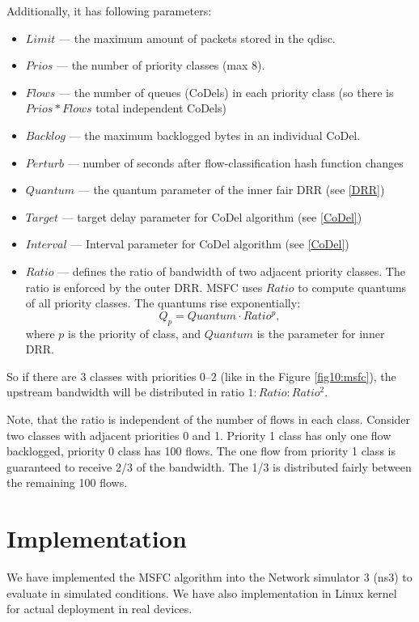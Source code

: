 Additionally, it has following parameters:
\begin{itemize}
	\item $Limit$ --- the maximum amount of packets stored in the qdisc.
	\item $Prios$ --- the number of priority classes (max 8).
	\item $Flows$ --- the number of queues (CoDels) in each priority class (so there is $Prios*Flows$ total independent CoDels)
	\item $Backlog$ --- the maximum backlogged bytes in an individual CoDel.
	\item $Perturb$ --- number of seconds after flow-classification hash function changes
	\item $Quantum$ --- the quantum parameter of the inner fair DRR (see \ref{DRR})
	\item $Target$ --- target delay parameter for CoDel algorithm (see \ref{CoDel})
	\item $Interval$ --- Interval parameter for CoDel algorithm (see \ref{CoDel})
	\item $Ratio$ --- defines the ratio of bandwidth of two adjacent priority classes. The ratio is enforced by the outer DRR. MSFC uses $Ratio$ to compute quantums of all priority classes. The quantums rise exponentially:
	\[
	Q_p = Quantum \cdot Ratio^p,
	\]
	where $p$ is the priority of class, and $Quantum$ is the parameter for inner DRR.
\end{itemize}
So if there are 3 classes with priorities 0--2 (like in the Figure \ref{fig10:msfc}), the upstream bandwidth will be distributed in ratio $1:Ratio:Ratio^2$.

Note, that the ratio is independent of the number of flows in each class. Consider two classes with adjacent priorities 0 and 1. Priority 1 class has only one flow backlogged, priority 0 class has 100 flows. The one flow from priority 1 class is guaranteed to receive 2/3 of the bandwidth. The 1/3 is distributed fairly between the remaining 100 flows.


\section {Implementation}

We have implemented the MSFC algorithm into the Network simulator 3 (ns3) to evaluate in simulated conditions. We have also implementation in Linux kernel for actual deployment in real devices.

